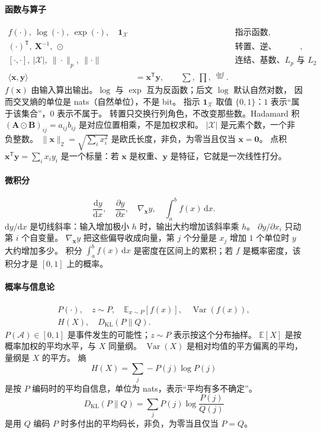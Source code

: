 \paragraph{函数与算子}
\begin{align*}
f(\cdot),\ \log(\cdot),\ \exp(\cdot),
\quad
\mathbf{1}_{\mathcal{X}}
&&\text{指示函数},\\
(\cdot)^{\mathsf T},\ \bm{X}^{-1},\ \odot
&&\text{转置、逆、Hadamard 积},\\
[\cdot,\cdot],\ |\mathcal{X}|,\ \|\cdot\|_p,\ \|\cdot\|
&&\text{连结、基数、$L_p$ 与 $L_2$},\\
\langle\bm{x},\bm{y}\rangle
&=\bm{x}^{\mathsf T}\bm{y},
\qquad
\sum,\ \prod,\ \stackrel{\mathrm{def}}{=}.
\end{align*}
$f(\bm{x})$ 由输入算出输出。$\log$ 与 $\exp$ 互为反函数；后文 $\log$ 默认自然对数，
因而交叉熵的单位是 nats（自然单位），不是 bit。
指示 $\mathbf{1}_{\mathcal{X}}$ 取值 $\{0,1\}$：$1$ 表示“属于该集合”，$0$ 表示不属于。
转置只交换行列角色，不改变那些数。Hadamard 积 $(\bm{A}\odot\bm{B})_{ij}=a_{ij}b_{ij}$
是对应位置相乘，不是加权求和。
$|\mathcal{X}|$ 是元素个数，一个非负整数。
$\|\bm{x}\|_2=\sqrt{\sum_i x_i^2}$ 是欧氏长度，非负，为零当且仅当 $\bm{x}=\bm{0}$。
点积 $\bm{x}^{\mathsf T}\bm{y}=\sum_i x_i y_i$ 是一个标量：若 $\bm{x}$ 是权重、$\bm{y}$ 是特征，它就是一次线性打分。

\paragraph{微积分}
\[
\frac{\mathrm{d}y}{\mathrm{d}x},\quad
\frac{\partial y}{\partial x},\quad
\nabla_{\bm{x}}y,\quad
\int_a^b f(x)\,\mathrm{d}x.
\]
$\mathrm{d}y/\mathrm{d}x$ 是切线斜率：输入增加极小 $h$ 时，输出大约增加该斜率乘 $h$。
$\partial y/\partial x_i$ 只动第 $i$ 个自变量。
$\nabla_{\bm{x}}y$ 把这些偏导收成向量，第 $j$ 个分量是 $x_j$ 增加 $1$ 个单位时 $y$ 大约增加多少。
积分 $\int_a^b f(x)\,\mathrm{d}x$ 是密度在区间上的累积；若 $f$ 是概率密度，该积分才是 $[0,1]$ 上的概率。

\paragraph{概率与信息论}
\begin{align*}
P(\cdot),\quad z\sim P,
\quad
\mathbb{E}_{x\sim P}[f(x)],
\quad
\operatorname{Var}(f(x)),\\
H(X),\quad D_{\mathrm{KL}}(P\|Q).
\end{align*}
$P(\mathcal{A})\in[0,1]$ 是事件发生的可能性；$z\sim P$ 表示按这个分布抽样。
$\mathbb{E}[X]$ 是按概率加权的平均水平，与 $X$ 同量纲。
$\operatorname{Var}(X)$ 是相对均值的平方偏离的平均，量纲是 $X$ 的平方。
熵
\[
H(X)=\sum_{j}-P(j)\log P(j)
\]
是按 $P$ 编码时的平均自信息，单位为 nats，表示“平均有多不确定”。
\[
D_{\mathrm{KL}}(P\|Q)=\sum_{j}P(j)\log\frac{P(j)}{Q(j)}
\]
是用 $Q$ 编码 $P$ 时多付出的平均码长，非负，为零当且仅当 $P=Q$。
